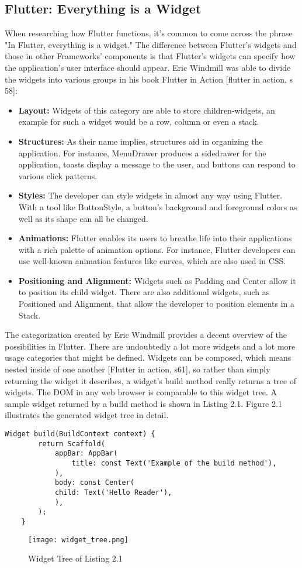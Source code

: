 \subsection{Flutter: Everything is a Widget}
When researching how Flutter functions, it's common to come across the phrase "In Flutter, everything is a widget." The difference between Flutter's widgets and those in other Frameworks' components is that Flutter's widgets can specify how the application's user interface should appear. Eric Windmill was able to divide the widgets into various groups in his book Flutter in Action [flutter in action, s 58]:

\begin{itemize}
	\item \textbf{Layout:} 
	Widgets of this category are able to store children-widgets, an example for such a widget would be a row, column or even a stack.  
	\item \textbf{Structures:} 
	As their name implies, structures aid in organizing the application.
	For instance, MenuDrawer produces a sidedrawer for the application, toasts display a message to the user, and buttons can respond to various click patterns. 
	\item \textbf{Styles:} 
	The developer can style widgets in almost any way using Flutter. With a tool like ButtonStyle, a button's background and foreground colors as well as its shape can all be changed.
	\item \textbf{Animations:} 
	Flutter enables its users to breathe life into their applications with a rich palette of animation options. For instance, Flutter developers can use well-known animation features like curves, which are also used in CSS. 
	\item \textbf{Positioning and Alignment:} 
	Widgets such as Padding and Center allow it to position its child widget. There are also additional widgets, such as Positioned and Alignment, that allow the developer to position elements in a Stack.
\end{itemize}
\noindent 
The categorization created by Eric Windmill provides a decent overview of the possibilities in Flutter. There are undoubtedly a lot more widgets and a lot more usage categories that might be defined. Widgets can be composed, which means nested inside of one another [Flutter in action, s61], so rather than simply returning the widget it describes, a widget's build method really returns a tree of widgets. The DOM in any web browser is comparable to this widget tree. A sample widget returned by a build method is shown in Listing 2.1. Figure 2.1 illustrates the generated widget tree in detail.
\begin{lstlisting}[caption=Flutter Scaffold Example]
	Widget build(BuildContext context) {
		return Scaffold(
			appBar: AppBar(
				title: const Text('Example of the build method'),
			),
			body: const Center(
			child: Text('Hello Reader'),
			),
		);
	}
\end{lstlisting}
\begin{figure}[H]
	\centering
	\texttt{[image: widget\_tree.png]}
	\caption[Widget Tree of Listing 2.1]{Widget Tree of Listing 2.1}
\end{figure}
